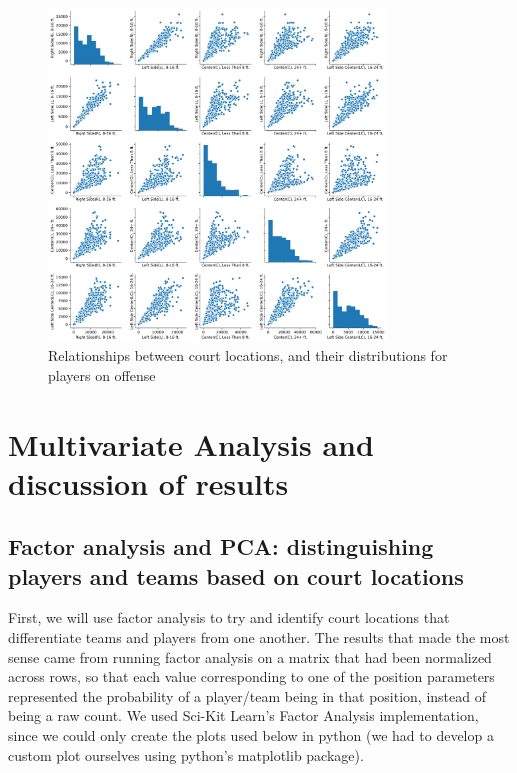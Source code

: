 \documentclass[]{article}
\begin{document}
\begin{figure}
\centering
\includegraphics[width=0.8\textwidth,height=\textheight]{player_dist_and_relationships.png}
\caption{Relationships between court locations, and their distributions
for players on offense}
\end{figure}

\hypertarget{multivariate-analysis-and-discussion-of-results}{%
\section{Multivariate Analysis and discussion of
results}\label{multivariate-analysis-and-discussion-of-results}}

\hypertarget{factor-analysis-and-pca-distinguishing-players-and-teams-based-on-court-locations}{%
\subsection{Factor analysis and PCA: distinguishing players and teams
based on court
locations}\label{factor-analysis-and-pca-distinguishing-players-and-teams-based-on-court-locations}}

First, we will use factor analysis to try and identify court locations
that differentiate teams and players from one another. The results that
made the most sense came from running factor analysis on a matrix that
had been normalized across rows, so that each value corresponding to one
of the position parameters represented the probability of a player/team
being in that position, instead of being a raw count. We used Sci-Kit
Learn's Factor Analysis implementation, since we could only create the
plots used below in python (we had to develop a custom plot ourselves
using python's matplotlib package).
\end{document}
